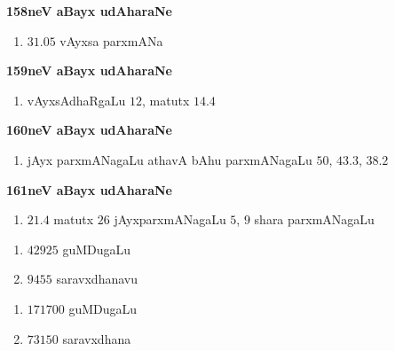 \medskip
\begin{minipage}{7cm}
\textbf{\large 158neV aBayx udAharaNe}
\begin{enumerate}[$(1)$]
\item $31.05$ vAyxsa parxmANa
\end{enumerate}
\end{minipage}
\begin{minipage}{7cm}
\textbf{\large 159neV aBayx udAharaNe}
\begin{enumerate}[$(1)$]
\item vAyxsAdhaRgaLu $12$, matutx $14.4$
\end{enumerate}
\end{minipage}

\medskip
\begin{minipage}{5cm}
\textbf{\large 160neV aBayx udAharaNe}
\begin{enumerate}[$(1)$]
\item jAyx parxmANagaLu athavA bAhu parxmANagaLu $50$, $43.3$, $38.2$
\end{enumerate}
\end{minipage}
\qquad\qquad \qquad 
\begin{minipage}{5cm}
\textbf{\large 161neV aBayx udAharaNe}
\begin{enumerate}[$(1)$]
\item $21.4$ matutx $26$ jAyxparxmANagaLu $5$, $9$ shara parxmANagaLu
\end{enumerate}
\end{minipage}


\begin{multicols}{2}
\begin{enumerate}[$(1)$]
\item $42925$ guMDugaLu
\item $9455$ saravxdhanavu
\end{enumerate}
\end{multicols}


\begin{multicols}{2}
\begin{enumerate}[$(1)$]
\item $171700$ guMDugaLu
\item $73150$ saravxdhana
\end{enumerate}
\end{multicols}


